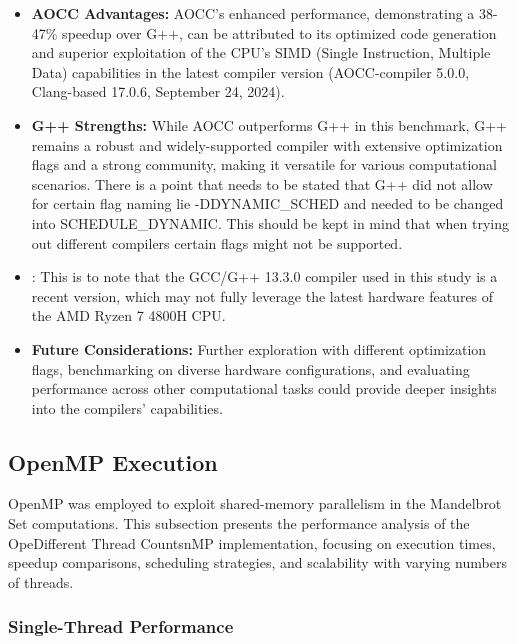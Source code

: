 \documentclass[
	report, %
	11pt, %
]{CSUniSchoolLabReport}
\newcounter{ct}
\begin{document}
\begin{itemize}
	\item \textbf{AOCC Advantages:} AOCC's enhanced performance, demonstrating a 38-47\% speedup over G++, can be attributed to its optimized code generation and superior exploitation of the CPU's SIMD (Single Instruction, Multiple Data) capabilities in the latest compiler version (AOCC-compiler 5.0.0, Clang-based 17.0.6, September 24, 2024).
	\item \textbf{G++ Strengths:} While AOCC outperforms G++ in this benchmark, G++ remains a robust and widely-supported compiler with extensive optimization flags and a strong community, making it versatile for various computational scenarios. There is a point that needs to be stated that G++ did not allow for certain flag naming lie -DDYNAMIC_SCHED and needed to be changed into SCHEDULE_DYNAMIC. This should be kept in mind that when trying out different compilers certain flags might not be supported.
	\item {}: This is to note that the GCC/G++ 13.3.0 compiler used in this study is a recent version, which may not fully leverage the latest hardware features of the AMD Ryzen 7 4800H CPU.
	\item \textbf{Future Considerations:} Further exploration with different optimization flags, benchmarking on diverse hardware configurations, and evaluating performance across other computational tasks could provide deeper insights into the compilers' capabilities.
\end{itemize}

\subsection{OpenMP Execution}

OpenMP was employed to exploit shared-memory parallelism in the Mandelbrot Set computations. This subsection presents the performance analysis of the OpeDifferent Thread CountsnMP implementation, focusing on execution times, speedup comparisons, scheduling strategies, and scalability with varying numbers of threads.

\subsubsection{Single-Thread Performance}
\end{document}
